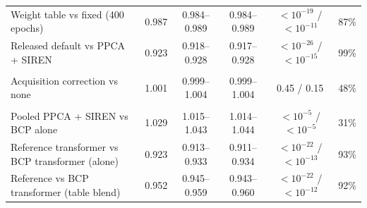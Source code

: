 \begin{tabular}{llcccc}
\quad Weight table vs fixed (400 epochs) & 0.987 & 0.984--0.989 & 0.984--0.989 & $<10^{-19}$ / $<10^{-11}$ & 87\% \\
\quad Released default vs PPCA + SIREN & 0.923 & 0.918--0.928 & 0.917--0.928 & $<10^{-26}$ / $<10^{-15}$ & 99\% \\
\addlinespace[2pt]
\multicolumn{6}{l}{\textit{Not helpful}} \\
\quad Acquisition correction vs none & 1.001 & 0.999--1.004 & 0.999--1.004 & 0.45 / 0.15 & 48\% \\
\addlinespace[2pt]
\multicolumn{6}{l}{\textit{Second cohort}} \\
\quad Pooled PPCA + SIREN vs BCP alone & 1.029 & 1.015--1.043 & 1.014--1.044 & $<10^{-5}$ / $<10^{-5}$ & 31\% \\
\quad Reference transformer vs BCP transformer (alone) & 0.923 & 0.913--0.933 & 0.911--0.934 & $<10^{-22}$ / $<10^{-13}$ & 93\% \\
\quad Reference vs BCP transformer (table blend) & 0.952 & 0.945--0.959 & 0.943--0.960 & $<10^{-22}$ / $<10^{-12}$ & 92\% \\
\bottomrule
\end{tabular}

